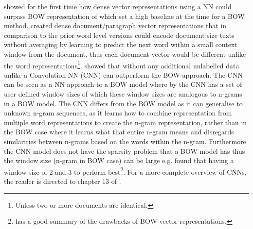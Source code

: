 \citet{le2014distributed} showed for the first time how dense vector representations using a NN could surpass BOW representation of which \citet{wang-manning-2012-baselines} set a high baseline at the time for a BOW method. \citet{le2014distributed} created dense document/paragraph vector representations that in comparison to the prior word level versions \citep{maas-etal-2011-learning} could encode document size texts without averaging by learning to predict the next word within a small context window from the document, thus each document vector would be different unlike the word representations\footnote{Unless two or more documents are identical.}. \citet{johnson-zhang-2015-effective} showed that without any additional unlabelled data unlike \citet{le2014distributed} a Convolution NN (CNN) can outperform the BOW approach. The CNN can be seen as a NN approach to a BOW model where by the CNN has a set of user defined window sizes of which these window sizes are analogous to n-grams in a BOW model. The CNN differs from the BOW model as it can generalise to unknown n-gram sequences, as it learns how to combine representation from multiple word representations to create the n-gram representation, rather than in the BOW case where it learns what that entire n-gram means and disregards similarities between n-grams based on the words within the n-gram. Furthermore the CNN model does not have the sparsity problem that a BOW model has thus the window size (n-gram in BOW case) can be large e.g. \citet{johnson-zhang-2015-effective} found that having a window size of 2 and 3 to perform best\footnote{\citet{le2014distributed} has a good summary of the drawbacks of BOW vector representations.}. For a more complete overview of CNNs, the reader is directed to chapter 13 of \citet{goldberg2017neural}.

